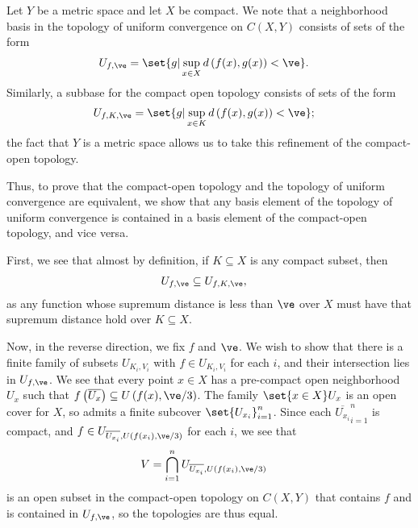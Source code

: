 \documentclass[10pt]{mypackage}
\begin{document}
\begin{solution}
  Let $Y$ be a metric space and let $X$ be compact. We note that a neighborhood basis in the topology of uniform convergence on $C\left( X,Y \right)$ consists of sets of the form
  \begin{align*}
    U_{f,\ve} &= \set{g | \sup_{x\in X}d\left( f(x),g(x) \right) < \ve}.
  \end{align*}
  Similarly, a subbase for the compact open topology consists of sets of the form
  \begin{align*}
    U_{f,K,\ve} &= \set{g | \sup_{x\in K}d\left( f(x),g(x) \right) < \ve};
  \end{align*}
  the fact that $Y$ is a metric space allows us to take this refinement of the compact-open topology.\newline

  Thus, to prove that the compact-open topology and the topology of uniform convergence are equivalent, we show that any basis element of the topology of uniform convergence is contained in a basis element of the compact-open topology, and vice versa.\newline

  First, we see that almost by definition, if $K\subseteq X$ is any compact subset, then
  \begin{align*}
    U_{f,\ve} &\subseteq U_{f,K,\ve},
  \end{align*}
  as any function whose supremum distance is less than $\ve$ over $X$ must have that supremum distance hold over $K\subseteq X$.\newline

  Now, in the reverse direction, we fix $f$ and $\ve$. We wish to show that there is a finite family of subsets $U_{K_i,V_i}$ with $f\in U_{K_i,V_i}$ for each $i$, and their intersection lies in $U_{f,\ve}$. We see that every point $x\in X$ has a pre-compact open neighborhood $U_x$ such that $f\left( \overline{U_x} \right) \subseteq U\left( f(x),\ve/3 \right)$. The family $\set{x\in X}U_x$ is an open cover for $X$, so admits a finite subcover $\set{U_{x_i}}_{i=1}^{n}$. Since each $ \overline{U_{x_i}}_{i=1}^{n} $ is compact, and $f\in U_{ \overline{U_{x_i}},U\left( f\left( x_i \right),\ve/3 \right) }$ for each $i$, we see that
  \begin{align*}
    V &= \bigcap_{i=1}^{n} U_{ \overline{U_{x_i}},U\left( f\left( x_i \right),\ve/3 \right) }
  \end{align*}
  is an open subset in the compact-open topology on $C\left( X,Y \right)$ that contains $f$ and is contained in $U_{f,\ve }$, so the topologies are thus equal.
\end{solution}
\end{document}
